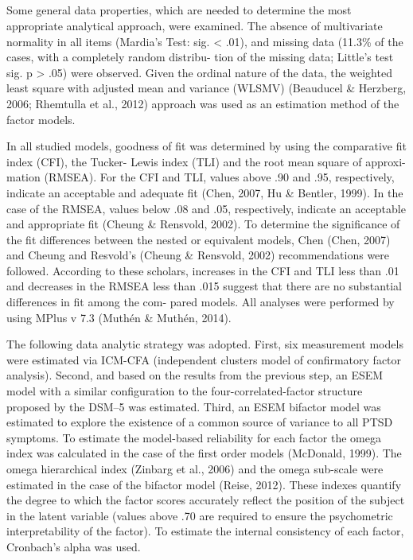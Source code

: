 \documentclass[
  english,
  man,floatsintext]{apa7}
\begin{document}
\begin{appendix}
\section{}
Some general data properties, which are needed to determine the most
appropriate analytical approach, were examined. The absence of
multivariate normality in all items (Mardia's Test: sig. \textless{}
.01), and missing data (11.3\% of the cases, with a completely random
distribu- tion of the missing data; Little's test sig. p \textgreater{}
.05) were observed. Given the ordinal nature of the data, the weighted
least square with adjusted mean and variance (WLSMV) (Beauducel \&
Herzberg, 2006; Rhemtulla et al., 2012) approach was used as an
estimation method of the factor models.

In all studied models, goodness of fit was determined by using the
comparative fit index (CFI), the Tucker- Lewis index (TLI) and the root
mean square of approxi- mation (RMSEA). For the CFI and TLI, values
above .90 and .95, respectively, indicate an acceptable and adequate fit
(Chen, 2007, Hu \& Bentler, 1999). In the case of the RMSEA, values
below .08 and .05, respectively, indicate an acceptable and appropriate
fit (Cheung \& Rensvold, 2002). To determine the significance of the fit
differences between the nested or equivalent models, Chen (Chen, 2007)
and Cheung and Resvold's (Cheung \& Rensvold, 2002) recommendations were
followed. According to these scholars, increases in the CFI and TLI less
than .01 and decreases in the RMSEA less than .015 suggest that there
are no substantial differences in fit among the com- pared models. All
analyses were performed by using MPlus v 7.3 (Muthén \& Muthén, 2014).

The following data analytic strategy was adopted. First, six measurement
models were estimated via ICM-CFA (independent clusters model of
confirmatory factor analysis). Second, and based on the results from the
previous step, an ESEM model with a similar configuration to the
four-correlated-factor structure proposed by the DSM--5 was estimated.
Third, an ESEM bifactor model was estimated to explore the existence of
a common source of variance to all PTSD symptoms. To estimate the
model-based reliability for each factor the omega index was calculated
in the case of the first order models (McDonald, 1999). The omega
hierarchical index (Zinbarg et al., 2006) and the omega sub-scale were
estimated in the case of the bifactor model (Reise, 2012). These indexes
quantify the degree to which the factor scores accurately reflect the
position of the subject in the latent variable (values above .70 are
required to ensure the psychometric interpretability of the factor). To
estimate the internal consistency of each factor, Cronbach's alpha was
used.


\end{appendix}
\end{document}

